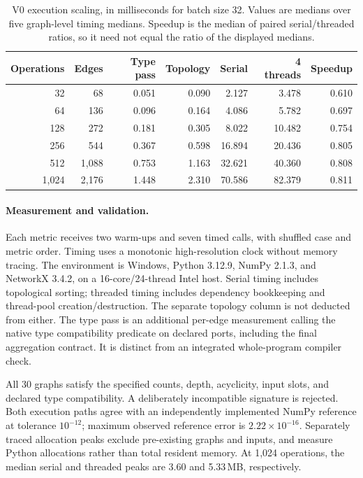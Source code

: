 \begin{table}[tb]
\centering
\small
\caption{V0 execution scaling, in milliseconds for batch size 32. Values are
medians over five graph-level timing medians. Speedup is the median of paired
serial/threaded ratios, so it need not equal the ratio of the displayed medians.}
\label{tab:revision_scaling_full}
\begin{tabular}{rrrrrrr}
\toprule
Operations & Edges & Type pass & Topology & Serial & 4 threads & Speedup \\
\midrule
32 & 68 & 0.051 & 0.090 & 2.127 & 3.478 & 0.610 \\
64 & 136 & 0.096 & 0.164 & 4.086 & 5.782 & 0.697 \\
128 & 272 & 0.181 & 0.305 & 8.022 & 10.482 & 0.754 \\
256 & 544 & 0.367 & 0.598 & 16.894 & 20.436 & 0.805 \\
512 & 1,088 & 0.753 & 1.163 & 32.621 & 40.360 & 0.808 \\
1,024 & 2,176 & 1.448 & 2.310 & 70.586 & 82.379 & 0.811 \\
\bottomrule
\end{tabular}
\end{table}

\paragraph{Measurement and validation.}
Each metric receives two warm-ups and seven timed calls, with shuffled case and
metric order. Timing uses a monotonic high-resolution clock without memory
tracing. The environment is Windows, Python 3.12.9, NumPy 2.1.3, and NetworkX
3.4.2, on a 16-core/24-thread Intel host. Serial timing includes topological
sorting; threaded timing includes dependency bookkeeping and thread-pool
creation/destruction. The separate topology column is not deducted from either.
The type pass is an additional per-edge measurement calling the native type
compatibility predicate on declared ports, including the final aggregation
contract. It is distinct from an integrated whole-program compiler check.

All 30 graphs satisfy the specified counts, depth, acyclicity, input slots, and
declared type compatibility. A deliberately incompatible signature is rejected.
Both execution paths agree with an independently implemented NumPy reference
at tolerance $10^{-12}$; maximum observed reference error is
$2.22\times10^{-16}$. Separately traced allocation peaks exclude pre-existing
graphs and inputs, and measure Python allocations rather than total resident
memory. At 1,024 operations, the median serial and threaded peaks are 3.60 and
5.33\,MB, respectively.

